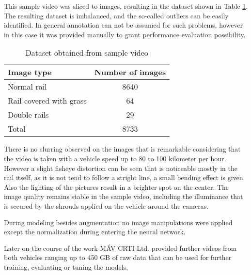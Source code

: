 This sample video was sliced to images, resulting in the dataset shown in Table \ref{table:dataset}.
The resulting dataset is imbalanced, and the so-called outliers can be easily identified.
In general annotation can not be assumed for such problems, however in this case it was
provided manually to grant performance evaluation possibility.

\begin{table}[!ht]
    \centering
    \begin{tabular}{l c}
        Image type              & Number of images \\
        \hline
        Normal rail             & 8640             \\
        Rail covered with grass & 64               \\
        Double rails            & 29               \\
        \hline
        Total                   & 8733             \\
    \end{tabular}
    \caption{Dataset obtained from sample video}
    \label{table:dataset}
\end{table}

There is no slurring observed on the images that is remarkable considering that the video is taken
with a vehicle speed up to 80 to 100 kilometer per hour.
However a slight fisheye distortion can be seen that is noticeable mostly in the rail itself,
as it is not tend to follow a stright line, a small bending effect is given.
Also the lighting of the pictures result in a brighter spot on the center.
The image quality remains stable in the sample video, including the illuminance that is
secured by the shrouds applied on the vehicle around the cameras.

During modeling besides augmentation no image manipulations were applied
except the normalization during entering the neural network.

Later on the course of the work MÁV CRTI Ltd. provided further videos from both vehicles
ranging up to 450 GB of raw data that can be used for further training, evaluating or tuning
the models.